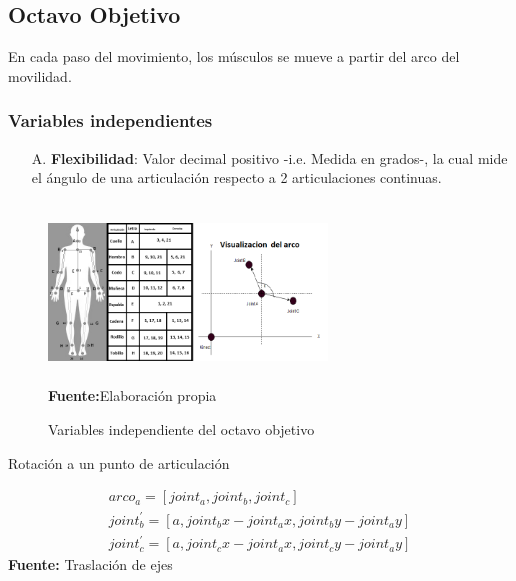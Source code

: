 \subsection{Octavo Objetivo} \label{vr:8o}
En cada paso del movimiento, los m\'usculos se mueve a partir del arco del  movilidad. 
\subsubsection{Variables independientes} \label{vr:8oi:indep}
\begin{enumerate}
	\item[A.] \textbf{Flexibilidad}: Valor decimal positivo -i.e. Medida en grados-, la cual mide el \'angulo de una articulaci\'on respecto a 2 articulaciones continuas.
\end{enumerate}	
\begin{figure}[H]
	\caption{Variables independiente del octavo  objetivo}
	\label{fig:varidep8}
	\centering
	\includegraphics[width=280px,height=180px]{graphics/EskeletanAngles.png} \\
	\textbf{Fuente:}Elaboraci\'on propia 
\end{figure}
\begin{formula}[h]
	\centering
	\caption{Rotaci\'on a un punto de articulaci\'on}
	\label{frm:rotEq}
	\begin{equation}
\begin{matrix}
arco_{a} = [joint_{a},joint_{b},joint_{c}]\\ 
joint_{b}^{'} = [a,joint_{b}x-joint_{a}x, joint_{b}y-joint_{a}y]\\ 
joint_{c}^{'} = [a,joint_{c}x-joint_{a}x, joint_{c}y-joint_{a}y]
\end{matrix}
	\end{equation}
	\textbf{Fuente:} Traslaci\'on de ejes \cite[p.~982]{aguilar2009matematicas}
\end{formula}  

